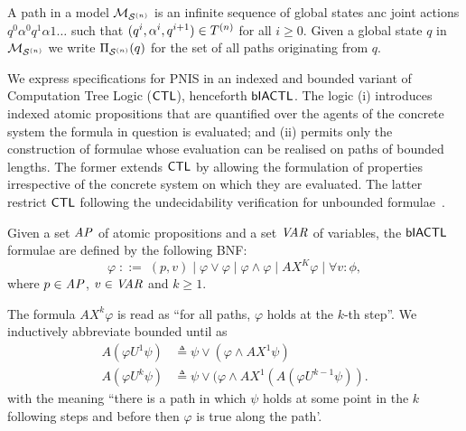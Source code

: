 \begin{example}
\begin{center}
  \end{center}
 
\end{example}


A path in a model $\mathcal{M}_{\mathcal{S}^{(n)}}$ is an infinite sequence of global states anc joint
actions $q^0\alpha^0q^1\alpha1\ldots$ such that $(q^i,\alpha^i,q^{i+1}) \in
T^{(n)}$ for all $i \geq 0$. Given a global state $q$ in $\mathcal{M}_{\mathcal{S}^{(n)}}$ we write
$\Pi_{\mathcal{S}^{(n)}}(q)$ for the set of all paths originating from $q$.
  
We express specifications for PNIS in an indexed and bounded variant of
Computation Tree Logic ($\sf{CTL}$), henceforth $\sf{bIACTL}$. The logic (i) introduces
indexed atomic propositions that are quantified over the agents of the concrete
system the formula in question is evaluated; and (ii) permits only the
construction of formulae whose evaluation can be realised on paths of bounded
lengths. The former extends $\sf{CTL}$ by allowing the formulation of properties
irrespective of the concrete system on which they are evaluated.  The latter
restrict $\sf{CTL}$ following the undecidability verification for unbounded
formulae~\cite{Akintunde+20}.

\begin{definition}
Given a  set $\it{AP}$ of atomic propositions and a set $\it{VAR}$ of variables,
the $\sf{bIACTL}$  formulae are defined by the following BNF:
\[
  \varphi \;   ::= \; (p, v) \mid \varphi \lor \varphi \mid \varphi \land \varphi
  \mid AX^K \varphi \mid \forall v : \phi,
\]
where  $p \in \it{AP}$, $v \in \it{VAR}$ and $k \geq  1$.
\end{definition}

The formula $AX^k \varphi$ is read as ``for all paths, $\varphi$ holds at the
$k$-th step''. We inductively abbreviate bounded until as
\begin{align*}
 A(\varphi U^1 \psi) &\triangleq \psi \lor (\varphi \land AX^1 \psi) \\
 A(\varphi U^k \psi) &\triangleq \psi \lor (\varphi \land AX^1 (A (\varphi U^{k-1} \psi)).
\end{align*}
with the meaning ``there is a path in which $\psi$ holds at some point in the
$k$ following steps and before then $\varphi$ is true along the path'. 

